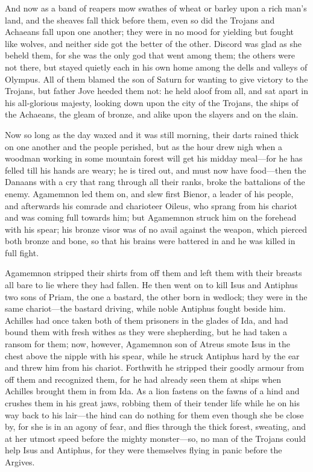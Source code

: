 And now as a band of reapers mow swathes of wheat or barley upon a rich
man’s land, and the sheaves fall thick before them, even so did the
Trojans and Achaeans fall upon one another; they were in no mood for
yielding but fought like wolves, and neither side got the better of the
other. Discord was glad as she beheld them, for she was the only god that
went among them; the others were not there, but stayed quietly each in his
own home among the dells and valleys of Olympus. All of them blamed the
son of Saturn for wanting to give victory to the Trojans, but father Jove
heeded them not: he held aloof from all, and sat apart in his all-glorious
majesty, looking down upon the city of the Trojans, the ships of the
Achaeans, the gleam of bronze, and alike upon the slayers and on the
slain.

Now so long as the day waxed and it was still morning, their darts rained
thick on one another and the people perished, but as the hour drew nigh
when a woodman working in some mountain forest will get his midday meal—for
he has felled till his hands are weary; he is tired out, and must now have
food—then the Danaans with a cry that rang through all their ranks,
broke the battalions of the enemy. Agamemnon led them on, and slew first
Bienor, a leader of his people, and afterwards his comrade and charioteer
Oileus, who sprang from his chariot and was coming full towards him; but
Agamemnon struck him on the forehead with his spear; his bronze visor was
of no avail against the weapon, which pierced both bronze and bone, so
that his brains were battered in and he was killed in full fight.

Agamemnon stripped their shirts from off them and left them with their
breasts all bare to lie where they had fallen. He then went on to kill
Isus and Antiphus two sons of Priam, the one a bastard, the other born in
wedlock; they were in the same chariot—the bastard driving, while
noble Antiphus fought beside him. Achilles had once taken both of them
prisoners in the glades of Ida, and had bound them with fresh withes as
they were shepherding, but he had taken a ransom for them; now, however,
Agamemnon son of Atreus smote Isus in the chest above the nipple with his
spear, while he struck Antiphus hard by the ear and threw him from his
chariot. Forthwith he stripped their goodly armour from off them and
recognized them, for he had already seen them at ships when Achilles
brought them in from Ida. As a lion fastens on the fawns of a hind and
crushes them in his great jaws, robbing them of their tender life while he
on his way back to his lair—the hind can do nothing for them even
though she be close by, for she is in an agony of fear, and flies through
the thick forest, sweating, and at her utmost speed before the mighty
monster—so, no man of the Trojans could help Isus and Antiphus, for
they were themselves flying in panic before the Argives.

